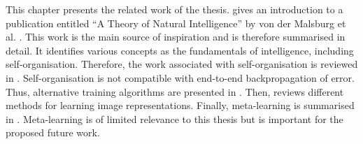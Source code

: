 This chapter presents the related work of the thesis.  gives an introduction to a publication entitled ``A Theory of Natural Intelligence'' by von der Malsburg et al. . This work is the main source of inspiration and is therefore summarised in detail. It identifies various concepts as the fundamentals of intelligence, including self-organisation. Therefore, the work associated with self-organisation is reviewed in . Self-organisation is not compatible with end-to-end backpropagation of error. Thus, alternative training algorithms are presented in . Then,  reviews different methods for learning image representations. Finally, meta-learning is summarised in . Meta-learning is of limited relevance to this thesis but is important for the proposed future work.

